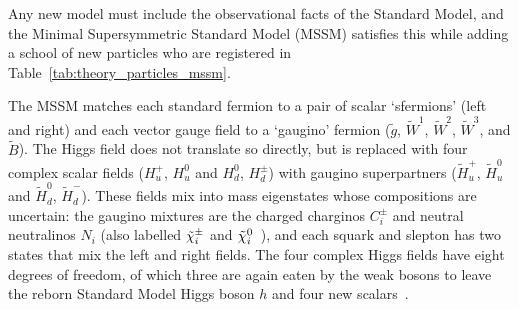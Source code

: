 Any new model must include the observational facts of the Standard Model,
and the Minimal Supersymmetric Standard Model (MSSM) satisfies this while
adding a school of new particles
who are registered in Table~\ref{tab:theory_particles_mssm}.

The MSSM matches each standard fermion to a pair of scalar
`sfermions' (left and right)
and each vector gauge field to a `gaugino' fermion
($\tilde g$, $\tilde W^1$, $\tilde W^2$, $\tilde W^3$, and $\tilde B$).
The Higgs field does not translate so directly, but is replaced with four
complex scalar fields
($H^+_u$, $H^0_u$ and $H^0_d$, $H^\pm_d$) with
gaugino superpartners
($\tilde H^+_u$, $\tilde H^0_u$ and $\tilde H^0_d$, $\tilde H^-_d$).
These fields mix into mass eigenstates whose compositions are uncertain:
the gaugino mixtures are the charged charginos $C^\pm_i$ and
neutral neutralinos $N_i$
(also labelled $\tilde\chi^\pm_i$ and $\tilde\chi^0_i$~\cite{atlas2022searches}),
and each squark and slepton has two states that mix the left and right fields.
The four complex Higgs fields have eight degrees of freedom, of which three are
again eaten by the weak bosons to leave the reborn Standard Model Higgs boson $h$
and four new scalars~\cite{martin2016primer}.

